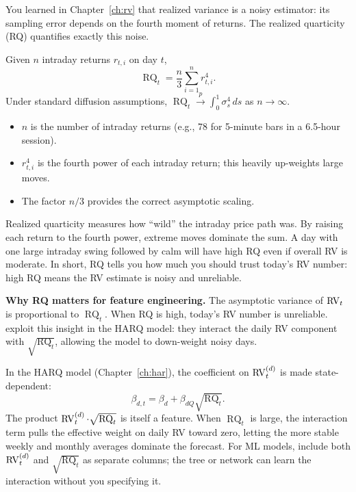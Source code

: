 You learned in Chapter~\ref{ch:rv} that realized variance is a noisy estimator: its sampling error depends on the fourth moment of returns.
The realized quarticity (RQ) quantifies exactly this noise.

\begin{definition}
Given $n$ intraday returns $r_{t,i}$ on day $t$,
\begin{equation}\label{eq:rq-feat}
\operatorname{RQ}_t = \frac{n}{3} \sum_{i=1}^{n} r_{t,i}^4.
\end{equation}
Under standard diffusion assumptions, $\operatorname{RQ}_t \xrightarrow{p} \int_0^1 \sigma_s^4 \, ds$ as $n \to \infty$.
\end{definition}

\begin{itemize}[nosep]
  \item $n$ is the number of intraday returns (e.g., 78 for 5-minute bars in a 6.5-hour session).
  \item $r_{t,i}^4$ is the fourth power of each intraday return; this heavily up-weights large moves.
  \item The factor $n/3$ provides the correct asymptotic scaling.
\end{itemize}

\begin{intuition}
Realized quarticity measures how ``wild'' the intraday price path was. By raising each return to the fourth power, extreme moves dominate the sum. A day with one large intraday swing followed by calm will have high RQ even if overall RV is moderate. In short, RQ tells you how much you should trust today's RV number: high RQ means the RV estimate is noisy and unreliable.
\end{intuition}

\textbf{Why RQ matters for feature engineering.}
The asymptotic variance of $\operatorname{RV}_t$ is proportional to $\operatorname{RQ}_t$.
When RQ is high, today's RV number is unreliable.
\citet{BollerslevPattonQuaedvlieg2016HARQ} exploit this insight in the HARQ model: they interact the daily RV component with $\sqrt{\operatorname{RQ}_t}$, allowing the model to down-weight noisy days.

\begin{keyidea}
In the HARQ model (Chapter~\ref{ch:har}), the coefficient on $\operatorname{RV}_t^{(d)}$ is made state-dependent:
\[
\beta_{d,t} = \beta_d + \beta_{dQ} \sqrt{\operatorname{RQ}_t}.
\]
The product $\operatorname{RV}_t^{(d)} \cdot \sqrt{\operatorname{RQ}_t}$ is itself a feature.
When $\operatorname{RQ}_t$ is large, the interaction term pulls the effective weight on daily RV toward zero, letting the more stable weekly and monthly averages dominate the forecast.
For ML models, include both $\operatorname{RV}_t^{(d)}$ and $\sqrt{\operatorname{RQ}_t}$ as separate columns; the tree or network can learn the interaction without you specifying it.
\end{keyidea}

